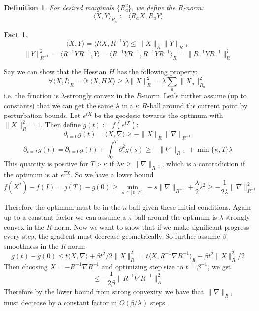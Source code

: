 \documentclass{article}
\newtheorem{fact}[theorem]{Fact}
\newtheorem{definition}{Definition}
\begin{document}
\begin{definition}
For desired marginals $\{R_{a}^{2}\}$, we define the $R$-norm:
\[ \langle X, Y \rangle_{R_{a}} := \langle R_{a} X, R_{a} Y \rangle  \]
\end{definition}

\begin{fact}
\[ \langle X, Y \rangle = \langle R X, R^{-1} Y \rangle \leq \|X\|_{R} \|Y\|_{R^{-1}}   \]
\[ \|Y\|_{R^{-1}}^{2} = \langle R^{-1} Y R^{-1}, Y \rangle = \langle R^{-1} Y R^{-1}, R^{-1} Y R^{-1} \rangle_{R} = \|R^{-1} Y R^{-1}\|_{R}^{2}    \]
\end{fact}

Say we can show that the Hessian $H$ has the following property:
\[ \forall \langle X, I \rangle_{R} = 0: \langle X, H X \rangle \geq \lambda \|X\|_{R}^{2} = \lambda \sum_{a} \|X_{a}\|_{R_{a}}^{2} \]
i.e. the function is $\lambda$-strongly convex in the $R$-norm. Let's further assume (up to constants) that we can get the same $\lambda$ in a $\kappa$ $R$-ball around the current point by perturbation bounds. Let $e^{tX}$ be the geodesic towards the optimum with $\|X\|_{R}^{2} = 1$. Then define $g(t) := f(e^{tX})$:
\[ \partial_{t=0} g(t) = \langle X, \nabla \rangle \geq - \|X\|_{R} \|\nabla\|_{R^{-1}}   \]
\[ \partial_{t=T} g(t) = \partial_{t=0} g(t) + \int_{0}^{T} \partial_{s}^{2} g(s) \geq - \|\nabla\|_{R^{-1}} + \min\{\kappa, T\} \lambda  \]
This quantity is positive for $T > \kappa$ if $\lambda \kappa \geq \|\nabla\|_{R^{-1}}$, which is a contradiction if the optimum is at $e^{TX}$. So we have a lower bound
\[ f(X^{*}) - f(I) = g(T) - g(0) \geq \min_{s \in [0,T]} -s \|\nabla\|_{R^{-1}} + \frac{\lambda}{2} s^{2} \geq - \frac{1}{2 \lambda} \|\nabla\|_{R^{-1}}^{2}  \]


Therefore the optimum must be in the $\kappa$ ball given these initial conditions. Again up to a constant factor we can assume a $\kappa$ ball around the optimum is $\lambda$-strongly convex in the $R$-norm. Now we want to show that if we make significant progress every step, the gradient must decrease geometrically. So further assume $\beta$-smoothness in the $R$-norm:
\[ g(t) - g(0) \leq t \langle X, \nabla \rangle + \beta t^{2}/2 \|X\|_{R}^{2} = t \langle X, R^{-1} \nabla R^{-1} \rangle_{R} + \beta t^{2}\|X\|_{R}^{2}/2  \]
Then choosing $X = -R^{-1} \nabla R^{-1}$ and optimizing step size to $t = \beta^{-1}$, we get
\[ \leq - \frac{1}{2\beta} \|R^{-1} \nabla R^{-1}\|_{R}^{2}  \]
Therefore by the lower bound from strong convexity, we have that $\|\nabla\|_{R^{-1}}$ must decrease by a constant factor in $O(\beta/\lambda)$ steps. 
\end{document}
